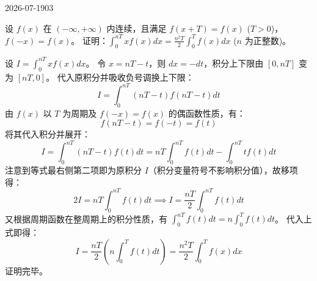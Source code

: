 \begin{mistake}{2026-07-19}{03}

\begin{problemcontent}
设 \(f(x)\) 在 \((-\infty, +\infty)\) 内连续，且满足 \(f(x+T) = f(x)\) (\(T>0\))，\(f(-x) = f(x)\)。
证明：\(\int_0^{nT} x f(x) dx = \frac{n^2 T}{2} \int_0^T f(x) dx\) (\(n\) 为正整数)。
\end{problemcontent}

\begin{solutioncontent}
设 \(I = \int_0^{nT} x f(x) dx\)。
令 \(x = nT - t\)，则 \(dx = -dt\)，积分上下限由 \([0, nT]\) 变为 \([nT, 0]\)。
代入原积分并吸收负号调换上下限：
\[I = \int_0^{nT} (nT - t) f(nT - t) dt\]
由 \(f(x)\) 以 \(T\) 为周期及 \(f(-x) = f(x)\) 的偶函数性质，有：
\[f(nT - t) = f(-t) = f(t)\]
将其代入积分并展开：
\[I = \int_0^{nT} (nT - t) f(t) dt = nT \int_0^{nT} f(t) dt - \int_0^{nT} t f(t) dt\]
注意到等式最右侧第二项即为原积分 \(I\)（积分变量符号不影响积分值），故移项得：
\[2I = nT \int_0^{nT} f(t) dt \implies I = \frac{nT}{2} \int_0^{nT} f(t) dt\]
又根据周期函数在整周期上的积分性质，有 \(\int_0^{nT} f(t) dt = n \int_0^T f(t) dt\)。
代入上式即得：
\[I = \frac{nT}{2} \left( n \int_0^T f(t) dt \right) = \frac{n^2 T}{2} \int_0^T f(x) dx\]
证明完毕。
\end{solutioncontent}


\end{mistake}
